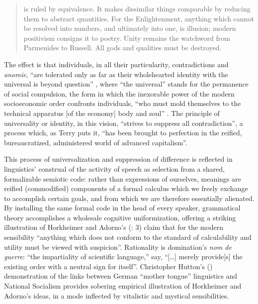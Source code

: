 \documentclass[output=paper]{langscibook}
\begin{document}
\begin{quotation}
is ruled by equivalence. It makes dissimilar things comparable by reducing them to abstract quantities. For the Enlightenment, anything which cannot be resolved into numbers, and ultimately into one, is illusion; modern positivism consigns it to poetry. Unity remains the watchword from Parmenides to Russell. All gods and qualities must be destroyed. \citep[4-5]{HorkheimerAdorno20021944}
\end{quotation}

The effect is that individuals, in all their particularity, contradictions and \emph{anomie}, ``are tolerated only as far as their wholehearted identity with the universal is beyond question'' \citep[124]{HorkheimerAdorno20021944}, where ``the universal'' stands for the permanence of social compulsion, the form in which the inexorable power of the modern socioeconomic order confronts individuals, ``who must mold themselves to the technical apparatus [of the economy] body and soul'' \citep[23]{HorkheimerAdorno20021944}. The principle of universality or identity, in this vision, ``strives to suppress all contradiction'', a process which, as Terry \citet[127]{Eagleton1991} puts it, ``has been brought to perfection in the reified, bureaucratized, administered world of advanced capitalism''.

This process of universalization and suppression of difference is reflected in linguistics' construal of the activity of speech as selection from a shared, formalizable semiotic code: rather than expressions of ourselves, meanings are reified (commodified) components of a formal calculus which we freely exchange to accomplish certain goals, and from which we are therefore essentially alienated. By installing the same formal code in the head of every speaker, grammatical theory accomplishes a wholesale cognitive uniformization, offering a striking illustration of Horkheimer and Adorno's (\citeyear{HorkheimerAdorno20021944}: 3) claim that for the modern sensibility ``anything which does not conform to the standard of calculability and utility must be viewed with suspicion''. Rationality is domination's \emph{nom de guerre}: ``the impartiality of scientific language,'' \citet[17]{HorkheimerAdorno20021944} say, ``[…] merely provide[s] the existing order with a neutral sign for itself''.  Christopher Hutton’s (\citeyear{Hutton1999}) demonstration of the links between German ``mother tongue'' linguistics and National Socialism provides sobering empirical illustration of Horkheimer and Adorno's ideas, in a mode inflected by vitalistic and mystical sensibilities.
\end{document}
